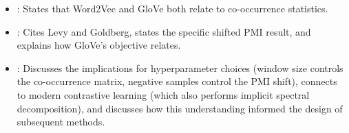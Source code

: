 \begin{interviewq}
\goodgreat
\begin{itemize}
    \item {}: States that Word2Vec and GloVe both relate to
    co-occurrence statistics.
    \item {}: Cites Levy and Goldberg, states the specific
    shifted PMI result, and explains how GloVe's objective relates.
    \item {}: Discusses the implications for hyperparameter
    choices (window size controls the co-occurrence matrix, negative
    samples control the PMI shift), connects to modern contrastive learning
    (which also performs implicit spectral decomposition), and discusses
    how this understanding informed the design of subsequent methods.
\end{itemize}

\end{interviewq}

\vspace{0.5em}

